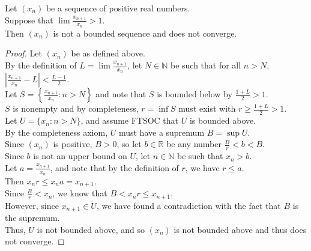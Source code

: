 \documentclass{article}
\newenvironment{theorem}[1]{\renewcommand\theinnercustomthm{#1}\innercustomthm}
  {\endinnercustomthm}
\begin{document}
\newpage{}
\begin{theorem}{6}
    Let $(x_n)$ be a sequence of positive real numbers. \\
    Suppose that $\lim \frac{x_{n+1}}{x_n} > 1$. \\
    Then $(x_n)$ is not a bounded sequence and does not converge.
\end{theorem}
\begin{proof}
    Let $(x_n)$ be as defined above. \\
    By the definition of $L = \lim \frac{x_{n+1}}{x_n}$, let $N \in \mathbb N$ be such that for all $n > N$, $\left|\frac{x_{n+1}}{x_n} - L\right| < \frac{L - 1}{2}$. \\
    Let $S = \left\{\frac{x_{n+1}}{x_n} : n > N\right\}$ and note that $S$ is bounded below by $\frac{1+L}{2} > 1$. \\
    $S$ is nonempty and by completeness, $r=\inf S$ must exist with $r \ge \frac{1+L}{2} > 1$. \\
    Let $U = \{ x_n : n > N\}$, and assume FTSOC that $U$ is bounded above. \\
    By the completeness axiom, $U$ must have a supremum $B = \sup U$. \\
    Since $(x_n)$ is positive, $B > 0$, so let $b\in \mathbb R$ be any number $\frac{B}{r} < b < B$. \\
    Since $b$ is not an upper bound on $U$, let $n \in \mathbb N$ be such that $x_n > b$. \\
    Let $a = \frac{x_{n+1}}{x_n}$, and note that by the definition of $r$, we have $r \le a$. \\
    Then $x_n r\le x_n a = x_{n+1}$. \\
    Since $\frac{B}{r} < x_n$, we know that $B < x_n r \le x_{n+1}$. \\
    However, since $x_{n+1} \in U$, we have found a contradiction with the fact that $B$ is the supremum. \\
    Thus, $U$ is not bounded above, and so $(x_n)$ is not bounded above and thus does not converge.
\end{proof}
\end{document}

